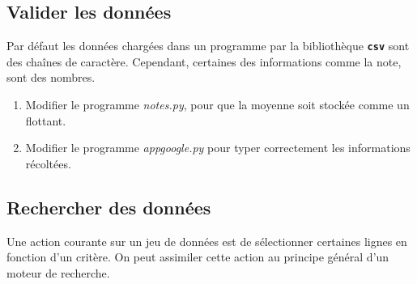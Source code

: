 \documentclass[a4paper,11pt]{article}
\begin{document}
\subsection{Valider les données}
Par défaut les données chargées dans un programme par la bibliothèque \textbf{\texttt{csv}} sont des chaînes de caractère. Cependant, certaines des informations comme la note, sont des nombres.
\begin{activite}
    \begin{enumerate}
        \item Modifier le programme \emph{notes.py}, pour que la moyenne soit stockée comme un flottant.
        \item  Modifier le programme \emph{appgoogle.py} pour typer correctement les informations récoltées.
    \end{enumerate}

\end{activite}
\subsection{Rechercher des données}
Une action courante sur un jeu de données est de sélectionner certaines lignes en fonction d'un critère. On peut assimiler cette action au principe général d'un moteur de recherche.
\end{document}
